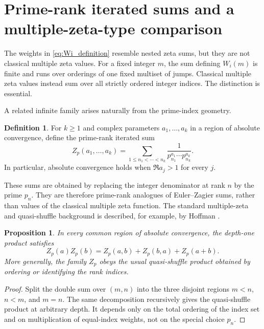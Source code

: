 \documentclass[11pt]{amsart}
\numberwithin{equation}{section}
\theoremstyle{plain}
\newtheorem{proposition}[theorem]{Proposition}
\theoremstyle{definition}
\newtheorem{definition}[theorem]{Definition}
\theoremstyle{remark}
\begin{document}
\section{Prime-rank iterated sums and a multiple-zeta-type comparison}
\label{sec:prime_rank_mzv}

The weights in \eqref{eq:Wi_definition} resemble nested zeta sums, but they are not classical multiple zeta values.  For a fixed integer $m$, the sum defining $W_i(m)$ is finite and runs over orderings of one fixed multiset of jumps.  Classical multiple zeta values instead sum over all strictly ordered integer indices.  The distinction is essential.

A related infinite family arises naturally from the prime-index geometry.

\begin{definition}
\label{def:prime_rank_multiple_zeta}
For $k\ge1$ and complex parameters $a_1,\ldots,a_k$ in a region of absolute convergence, define the prime-rank iterated sum
\begin{equation}
Z_p(a_1,\ldots,a_k)
=
\sum_{1\le n_1<\cdots<n_k}
\frac{1}{p_{n_1}^{a_1}\cdots p_{n_k}^{a_k}}.
\label{eq:prime_rank_multiple_zeta}
\end{equation}
In particular, absolute convergence holds when $\Re a_j>1$ for every $j$.
\end{definition}

These sums are obtained by replacing the integer denominator at rank $n$ by the prime $p_n$.  They are therefore prime-rank analogues of Euler--Zagier sums, rather than values of the classical multiple zeta function.  The standard multiple-zeta and quasi-shuffle background is described, for example, by Hoffman \cite{Hoffman1992}.

\begin{proposition}
\label{prop:prime_rank_stuffle}
In every common region of absolute convergence, the depth-one product satisfies
\begin{equation}
Z_p(a)Z_p(b)
=
Z_p(a,b)+Z_p(b,a)+Z_p(a+b).
\label{eq:prime_rank_stuffle_depth_two}
\end{equation}
More generally, the family $Z_p$ obeys the usual quasi-shuffle product obtained by ordering or identifying the rank indices.
\end{proposition}

\begin{proof}
Split the double sum over $(m,n)$ into the three disjoint regions $m<n$, $n<m$, and $m=n$.  The same decomposition recursively gives the quasi-shuffle product at arbitrary depth.  It depends only on the total ordering of the index set and on multiplication of equal-index weights, not on the special choice $p_n$.
\end{proof}
\end{document}
